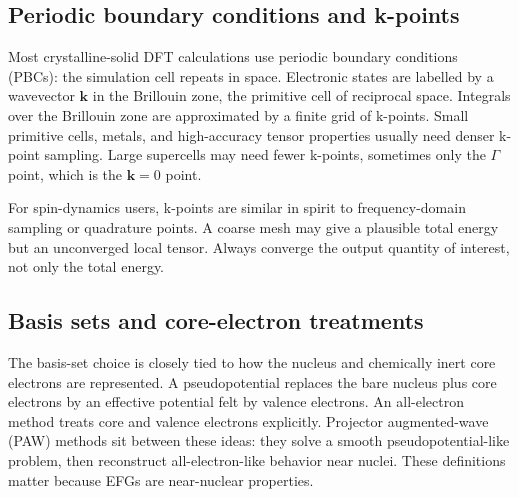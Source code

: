 \documentclass[11pt]{article}
\begin{document}
\subsection{Periodic boundary conditions and k-points}

Most crystalline-solid DFT calculations use periodic boundary conditions (PBCs): the simulation cell repeats in space.  Electronic states are labelled by a wavevector $\mathbf k$ in the Brillouin zone, the primitive cell of reciprocal space.  Integrals over the Brillouin zone are approximated by a finite grid of k-points.  Small primitive cells, metals, and high-accuracy tensor properties usually need denser k-point sampling.  Large supercells may need fewer k-points, sometimes only the $\Gamma$ point, which is the $\mathbf k=0$ point.

For spin-dynamics users, k-points are similar in spirit to frequency-domain sampling or quadrature points.  A coarse mesh may give a plausible total energy but an unconverged local tensor.  Always converge the output quantity of interest, not only the total energy.

\subsection{Basis sets and core-electron treatments}

The basis-set choice is closely tied to how the nucleus and chemically inert core electrons are represented.  A pseudopotential replaces the bare nucleus plus core electrons by an effective potential felt by valence electrons.  An all-electron method treats core and valence electrons explicitly.  Projector augmented-wave (PAW) methods sit between these ideas: they solve a smooth pseudopotential-like problem, then reconstruct all-electron-like behavior near nuclei.  These definitions matter because EFGs are near-nuclear properties.
\end{document}
